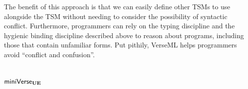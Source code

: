 The benefit of this approach is that we can easily define other TSMs to use alongside the  TSM without needing to consider the possibility of syntactic conflict. Furthermore, programmers can rely on the typing discipline and the hygienic binding discipline described above to reason about programs, including those that contain unfamiliar forms. Put pithily, VerseML helps programmers avoid ``conflict and confusion''. 


\section{\texorpdfstring{$\mathsf{miniVerse}_\textbf{UE}$}{miniVerseUE}}\label{sec:tsms-minimal-formalism}\label{sec:miniVerseU}

